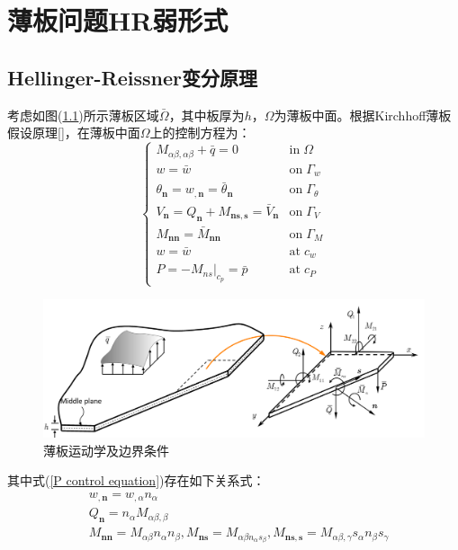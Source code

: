 \chapter{薄板问题HR弱形式}
\section{Hellinger-Reissner变分原理}
考虑如图(\ref{plate})所示薄板区域$\bar \Omega$，其中板厚为$h$，$\Omega$为薄板中面。根据Kirchhoff薄板假设原理[]，在薄板中面$\Omega$上的控制方程为：
\begin{equation}
    \begin{cases}\label{P control equation}
        M_{\alpha\beta,\alpha\beta}+\bar q=0&\mathrm{in} \; \Omega\\
        w=\bar w&\mathrm{on}\;\Gamma_w\\
        \theta_{\pmb n}=w_{,\pmb n}=\bar \theta_{\pmb n}&\mathrm{on}\;\Gamma_{\theta}\\
        V_{\pmb n}=Q_{\pmb n}+M_{\pmb{ns},\pmb s}=\bar V_{\pmb n}&\mathrm{on}\;\Gamma_V\\
        M_{\pmb{nn}}=\bar M_{\pmb{nn}}&\mathrm{on}\; \Gamma_M\\
        w=\bar w&\mathrm{at} \; c_w\\
        P=-M_{ns}\vert_{c_p}=\bar p&\mathrm{at}\; c_P
    \end{cases}
\end{equation}
\begin{figure}[!h]
    \centering
    \includegraphics[scale=0.7]{figure/P/plate.png}
    \caption{薄板运动学及边界条件}\label{plate}
\end{figure}
其中式(\ref{P control equation})存在如下关系式：
\begin{align}
\label{wn} &w_{,\pmb n}=w_{,\alpha}n_{\alpha}\\
\label{Qn} &Q_{\pmb n}=n_{\alpha}M_{\alpha\beta,\beta}\\
\label{Mn} &M_{\pmb{nn}}=M_{\alpha\beta}n_{\alpha}n_{\beta},M_{\pmb{ns}}=M_{\alpha\beta n_{\alpha}s_{\beta}},M_{\pmb{ns,s}}=M_{\alpha\beta,\gamma}s_{\alpha}n_{\beta}s_{\gamma}
\end{align}
